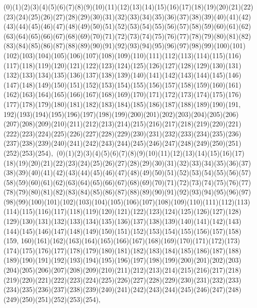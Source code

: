 \documentclass[12pt]{article}
\begin{document}
{(0)(1)(2)(3)(4)(5)(6)(7)(8)(9)(10)(11)(12)(13)(14)(15)(16)(17)(18)(19)(20)(21)(22)(23)(24)(25)(26)(27)(28)(29)(30)(31)(32)(33)(34)(35)(36)(37)(38)(39)(40)(41)(42)(43)(44)(45)(46)(47)(48)(49)(50)(51)(52)(53)(54)(55)(56)(57)(58)(59)(60)(61)(62)(63)(64)(65)(66)(67)(68)(69)(70)(71)(72)(73)(74)(75)(76)(77)(78)(79)(80)(81)(82)(83)(84)(85)(86)(87)(88)(89)(90)(91)(92)(93)(94)(95)(96)(97)(98)(99)(100)(101)(102)(103)(104)(105)(106)(107)(108)(109)(110)(111)(112)(113)(114)(115)(116)(117)(118)(119)(120)(121)(122)(123)(124)(125)(126)(127)(128)(129)(130)(131)(132)(133)(134)(135)(136)(137)(138)(139)(140)(141)(142)(143)(144)(145)(146)(147)(148)(149)(150)(151)(152)(153)(154)(155)(156)(157)(158)(159)(160)(161)(162)(163)(164)(165)(166)(167)(168)(169)(170)(171)(172)(173)(174)(175)(176)(177)(178)(179)(180)(181)(182)(183)(184)(185)(186)(187)(188)(189)(190)(191, 192)(193)(194)(195)(196)(197)(198)(199)(200)(201)(202)(203)(204)(205)(206)(207)(208)(209)(210)(211)(212)(213)(214)(215)(216)(217)(218)(219)(220)(221)(222)(223)(224)(225)(226)(227)(228)(229)(230)(231)(232)(233)(234)(235)(236)(237)(238)(239)(240)(241)(242)(243)(244)(245)(246)(247)(248)(249)(250)(251)(252)(253)(254)$
, 
$
(0)(1)(2)(3)(4)(5)(6)(7)(8)(9)(10)(11)(12)(13)(14)(15)(16)(17)(18)(19)(20)(21)(22)(23)(24)(25)(26)(27)(28)(29)(30)(31)(32)(33)(34)(35)(36)(37)(38)(39)(40)(41)(42)(43)(44)(45)(46)(47)(48)(49)(50)(51)(52)(53)(54)(55)(56)(57)(58)(59)(60)(61)(62)(63)(64)(65)(66)(67)(68)(69)(70)(71)(72)(73)(74)(75)(76)(77)(78)(79)(80)(81)(82)(83)(84)(85)(86)(87)(88)(89)(90)(91)(92)(93)(94)(95)(96)(97)(98)(99)(100)(101)(102)(103)(104)(105)(106)(107)(108)(109)(110)(111)(112)(113)(114)(115)(116)(117)(118)(119)(120)(121)(122)(123)(124)(125)(126)(127)(128)(129)(130)(131)(132)(133)(134)(135)(136)(137)(138)(139)(140)(141)(142)(143)(144)(145)(146)(147)(148)(149)(150)(151)(152)(153)(154)(155)(156)(157)(158)(159, 160)(161)(162)(163)(164)(165)(166)(167)(168)(169)(170)(171)(172)(173)(174)(175)(176)(177)(178)(179)(180)(181)(182)(183)(184)(185)(186)(187)(188)(189)(190)(191)(192)(193)(194)(195)(196)(197)(198)(199)(200)(201)(202)(203)(204)(205)(206)(207)(208)(209)(210)(211)(212)(213)(214)(215)(216)(217)(218)(219)(220)(221)(222)(223)(224)(225)(226)(227)(228)(229)(230)(231)(232)(233)(234)(235)(236)(237)(238)(239)(240)(241)(242)(243)(244)(245)(246)(247)(248)(249)(250)(251)(252)(253)(254)$
, 
$
}
\end{document}
